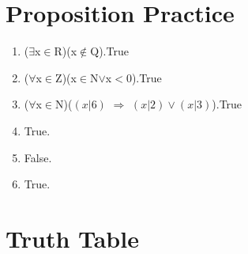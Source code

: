 \documentclass{article}
\begin{document}
	\section{Proposition Practice} 
		\begin{enumerate}
			\item ($\exists$x$\in$R)(x$\notin$Q).True
			\item ($\forall$x$\in$Z)(x$\in$N$\vee$x$<$0).True
			\item ($\forall$x$\in$N)($(x|6)$ $\Rightarrow$ $(x|2)\vee(x|3)$).True
			\item True.
			\item False.
			\item True.
		\end{enumerate}
	\section{Truth Table}
\end{document}
